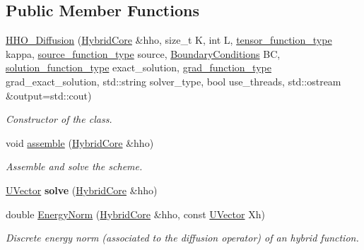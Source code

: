\subsection*{Public Member Functions}
\begin{DoxyCompactItemize}
\item 
\hyperlink{group__HHO__Diffusion_ga89f7078dcd1d4ffd848eed86cbfb00cf}{H\+H\+O\+\_\+\+Diffusion} (\hyperlink{classHArDCore3D_1_1HybridCore}{Hybrid\+Core} \&hho, size\+\_\+t K, int L, \hyperlink{classHArDCore3D_1_1HHO__Diffusion_a640287c18811b16ef9136832e99879a1}{tensor\+\_\+function\+\_\+type} kappa, \hyperlink{classHArDCore3D_1_1HHO__Diffusion_a2e1e24f77c08b2edbd8d836a91f6b08b}{source\+\_\+function\+\_\+type} source, \hyperlink{classBoundaryConditions}{Boundary\+Conditions} BC, \hyperlink{classHArDCore3D_1_1HHO__Diffusion_ab3104f23491ecb92d2701db651380148}{solution\+\_\+function\+\_\+type} exact\+\_\+solution, \hyperlink{classHArDCore3D_1_1HHO__Diffusion_a35b1f1e3277f1d675b12d4e7533e3d23}{grad\+\_\+function\+\_\+type} grad\+\_\+exact\+\_\+solution, std\+::string solver\+\_\+type, bool use\+\_\+threads, std\+::ostream \&output=std\+::cout)
\begin{DoxyCompactList}\small\item\em Constructor of the class. \end{DoxyCompactList}\item 
void \hyperlink{group__HHO__Diffusion_ga82476d19a0312e0b370a1f6100d863d1}{assemble} (\hyperlink{classHArDCore3D_1_1HybridCore}{Hybrid\+Core} \&hho)
\begin{DoxyCompactList}\small\item\em Assemble and solve the scheme. \end{DoxyCompactList}\item 
\hyperlink{classHArDCore3D_1_1UVector}{U\+Vector} {\bfseries solve} (\hyperlink{classHArDCore3D_1_1HybridCore}{Hybrid\+Core} \&hho)
\item 
double \hyperlink{group__HHO__Diffusion_ga18588364740b7c9a8fc25213499eaadd}{Energy\+Norm} (\hyperlink{classHArDCore3D_1_1HybridCore}{Hybrid\+Core} \&hho, const \hyperlink{classHArDCore3D_1_1UVector}{U\+Vector} Xh)
\begin{DoxyCompactList}\small\item\em Discrete energy norm (associated to the diffusion operator) of an hybrid function. \end{DoxyCompactList}\item 
\mbox{\label{classHArDCore3D_1_1HHO__Diffusion_aa2bb4d069026f1604d2899031d3642f1}} 

\end{DoxyCompactItemize}
